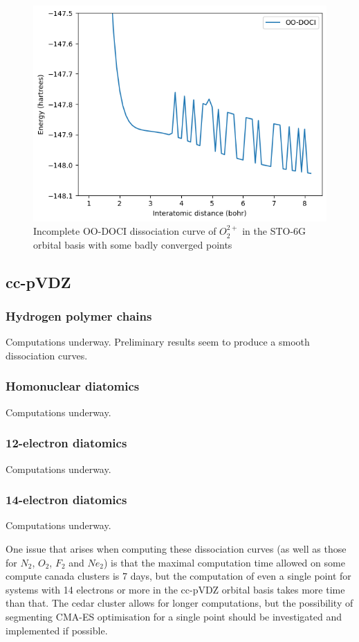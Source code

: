 \documentclass[twoside,twocolumn,9pt]{article}
\begin{document}
\begin{figure}
  \includegraphics[width=\linewidth]{O2++.png}
  \caption{Incomplete OO-DOCI dissociation curve of $O_2^{2+}$ in the STO-6G orbital basis with some badly converged points}\label{O2++}
\end{figure}

\subsection{cc-pVDZ}
\subsubsection{Hydrogen polymer chains}
Computations underway. Preliminary results seem to produce a smooth dissociation curves.

\subsubsection{Homonuclear diatomics}
Computations underway.

\subsubsection{12-electron diatomics}
Computations underway.

\subsubsection{14-electron diatomics}
Computations underway.

One issue that arises when computing these dissociation curves (as well as those for $N_2$, $O_2$, $F_2$ and $Ne_2$) is that the maximal computation time allowed on some compute canada clusters is 7 days, but the computation of even a single point for systems with 14 electrons or more in the cc-pVDZ orbital basis takes more time than that. The cedar cluster allows for longer computations, but the possibility of segmenting CMA-ES optimisation for a single point should be investigated and implemented if possible. 
\end{document}
